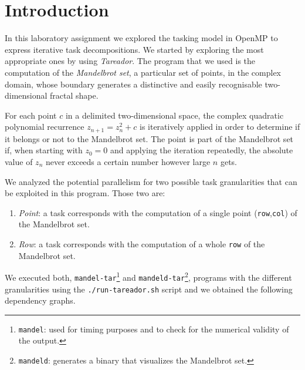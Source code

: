 \section{Introduction}%
\label{sec:Introduction}

In this laboratory assignment we explored the tasking model in OpenMP to express iterative task decompositions. 
We started by exploring the most appropriate ones by using \emph{Tareador}. The program that we used is the computation of the \emph{Mandelbrot set}, a particular set of points, in the complex domain, whose boundary generates a distinctive and easily recognisable two-dimensional fractal shape.

For each point $c$ in a delimited two-dimensional space, the complex quadratic polynomial recurrence $z_{n+1} = z^2_n + c$ is iteratively applied in order to determine if it belongs or not to the Mandelbrot set.  The point is part of the Mandelbrot set if, when starting with $z_0 = 0$ and applying the iteration repeatedly, the absolute value of $z_n$ never exceeds a certain number however large $n$ gets.

We analyzed the potential parallelism for two possible task granularities that can be exploited in this program. Those two are:
\begin{enumerate}[label=\alph*)]
\item \emph{Point}: a task corresponds with the computation of a single point (\texttt{row},\texttt{col}) of the Mandelbrot set.
\item \emph{Row}: a task corresponds with the computation of a whole \texttt{row} of the Mandelbrot set.
\end{enumerate}

We executed both, \texttt{mandel-tar}\footnote{\texttt{mandel}: used for timing purposes and to check for the numerical validity of the output.} and \texttt{mandeld-tar}\footnote{\texttt{mandeld}: generates a binary that visualizes the Mandelbrot set.}, programs with the different granularities using the \texttt{./run-tareador.sh} script and we obtained the following dependency graphs.

